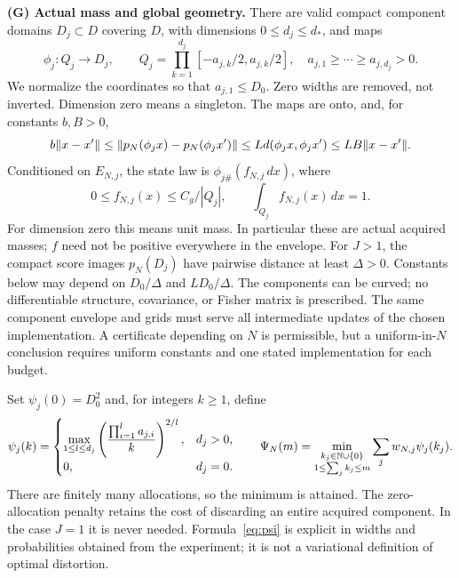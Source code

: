 \smallskip\noindent\textbf{(G) Actual mass and global geometry.}
There are valid compact component domains $D_j\subset D$ covering $D$, with dimensions $0\le d_j\le d_*$, and maps
\[
 \phi_j:Q_j\longrightarrow D_j,
 \qquad Q_j=\prod_{k=1}^{d_j}[-a_{j,k}/2,a_{j,k}/2],
 \quad a_{j,1}\ge\cdots\ge a_{j,d_j}>0.
\]
We normalize the coordinates so that $a_{j,1}\le D_0$. Zero widths are removed, not inverted. Dimension zero means a singleton. The maps are onto, and, for constants $b,B>0$,
\begin{equation}\label{eq:chart}
 b\lVert x-x'\rVert\le\lVert p_N(\phi_jx)-p_N(\phi_jx')\rVert\le Ld(\phi_jx,\phi_jx')
 \le LB\lVert x-x'\rVert.
\end{equation}
Conditioned on $E_{N,j}$, the state law is $\phi_{j\#}(f_{N,j}\,dx)$, where
\begin{equation}\label{eq:mass}
 0\le f_{N,j}(x)\le C_g/|Q_j|,\qquad \int_{Q_j}f_{N,j}(x)\,dx=1.
\end{equation}
For dimension zero this means unit mass. In particular these are actual acquired masses; $f$ need not be positive everywhere in the envelope. For $J>1$, the compact score images $p_N(D_j)$ have pairwise distance at least $\Delta>0$. Constants below may depend on $D_0/\Delta$ and $LD_0/\Delta$. The components can be curved; no differentiable structure, covariance, or Fisher matrix is prescribed. The same component envelope and grids must serve all intermediate updates of the chosen implementation. A certificate depending on $N$ is permissible, but a uniform-in-$N$ conclusion requires uniform constants and one stated implementation for each budget.

Set $\psi_j(0)=D_0^2$ and, for integers $k\ge1$, define
\begin{equation}\label{eq:psi}
 \psi_j(k)=
 \begin{cases}
 \displaystyle\max_{1\le l\le d_j}
 \left(\frac{\prod_{i=1}^l a_{j,i}}{k}\right)^{2/l},&d_j>0,\\
 0,&d_j=0.
 \end{cases}
 \qquad
 \Psi_N(m)=\min_{\substack{k_j\in\mathbb N\cup\{0\}\\1\le\sum_j k_j\le m}}
 \sum_j w_{N,j}\psi_j(k_j).
\end{equation}
There are finitely many allocations, so the minimum is attained. The zero-allocation penalty retains the cost of discarding an entire acquired component. In the case $J=1$ it is never needed. Formula~\eqref{eq:psi} is explicit in widths and probabilities obtained from the experiment; it is not a variational definition of optimal distortion.

